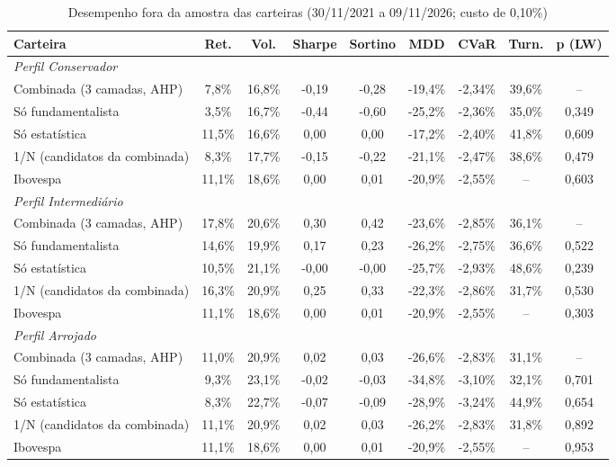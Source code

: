 \begin{table}[htbp]
\centering
\caption{Desempenho fora da amostra das carteiras (30/11/2021 a 09/11/2026; custo de 0,10\%)}
\label{tab:resultado-backtest}
\footnotesize
\begin{tabular}{|p{3.6cm}|c|c|c|c|c|c|c|c|}
\hline
\textbf{Carteira} & \textbf{Ret.} & \textbf{Vol.} & \textbf{Sharpe} & \textbf{Sortino} & \textbf{MDD} & \textbf{CVaR} & \textbf{Turn.} & \textbf{p (LW)} \\
\hline
\multicolumn{9}{|l|}{\textit{Perfil Conservador}} \\
\hline
Combinada (3 camadas, AHP) & 7,8\% & 16,8\% & -0,19 & -0,28 & -19,4\% & -2,34\% & 39,6\% & -- \\
\hline
Só fundamentalista & 3,5\% & 16,7\% & -0,44 & -0,60 & -25,2\% & -2,36\% & 35,0\% & 0,349 \\
\hline
Só estatística & 11,5\% & 16,6\% & 0,00 & 0,00 & -17,2\% & -2,40\% & 41,8\% & 0,609 \\
\hline
1/N (candidatos da combinada) & 8,3\% & 17,7\% & -0,15 & -0,22 & -21,1\% & -2,47\% & 38,6\% & 0,479 \\
\hline
Ibovespa & 11,1\% & 18,6\% & 0,00 & 0,01 & -20,9\% & -2,55\% & -- & 0,603 \\
\hline
\multicolumn{9}{|l|}{\textit{Perfil Intermediário}} \\
\hline
Combinada (3 camadas, AHP) & 17,8\% & 20,6\% & 0,30 & 0,42 & -23,6\% & -2,85\% & 36,1\% & -- \\
\hline
Só fundamentalista & 14,6\% & 19,9\% & 0,17 & 0,23 & -26,2\% & -2,75\% & 36,6\% & 0,522 \\
\hline
Só estatística & 10,5\% & 21,1\% & -0,00 & -0,00 & -25,7\% & -2,93\% & 48,6\% & 0,239 \\
\hline
1/N (candidatos da combinada) & 16,3\% & 20,9\% & 0,25 & 0,33 & -22,3\% & -2,86\% & 31,7\% & 0,530 \\
\hline
Ibovespa & 11,1\% & 18,6\% & 0,00 & 0,01 & -20,9\% & -2,55\% & -- & 0,303 \\
\hline
\multicolumn{9}{|l|}{\textit{Perfil Arrojado}} \\
\hline
Combinada (3 camadas, AHP) & 11,0\% & 20,9\% & 0,02 & 0,03 & -26,6\% & -2,83\% & 31,1\% & -- \\
\hline
Só fundamentalista & 9,3\% & 23,1\% & -0,02 & -0,03 & -34,8\% & -3,10\% & 32,1\% & 0,701 \\
\hline
Só estatística & 8,3\% & 22,7\% & -0,07 & -0,09 & -28,9\% & -3,24\% & 44,9\% & 0,654 \\
\hline
1/N (candidatos da combinada) & 11,1\% & 20,9\% & 0,02 & 0,03 & -26,2\% & -2,83\% & 31,8\% & 0,892 \\
\hline
Ibovespa & 11,1\% & 18,6\% & 0,00 & 0,01 & -20,9\% & -2,55\% & -- & 0,953 \\
\hline
\end{tabular}


\end{table}
